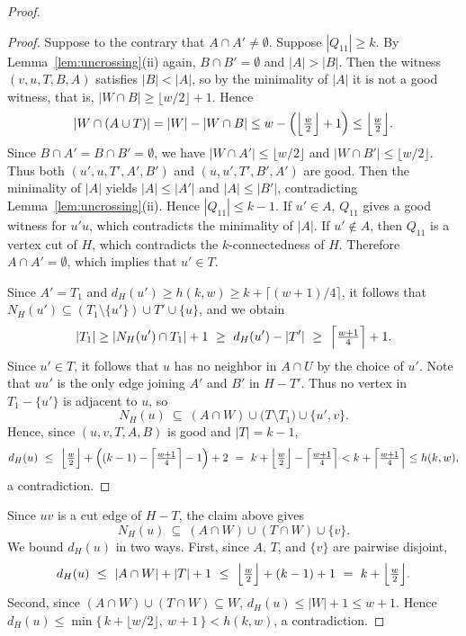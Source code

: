\documentclass[11pt]{article}
\numberwithin{equation}{section}
\begin{document}
\begin{proof}
\begin{proof}
Suppose to the contrary that $A\cap A'\neq \emptyset$. Suppose $|Q_{11}|\ge k$.
By Lemma~\ref{lem:uncrossing}(ii) again, $B\cap B'=\emptyset$ and $|A|>|B|$.
Then the witness $(v,u,T,B,A)$ satisfies $|B|<|A|$, so by the minimality of $|A|$ it is not a good witness, that is, $|W\cap B|\ge\lfloor w/2\rfloor+1$. Hence
\[
   |W\cap(A\cup T)|=|W|-|W\cap B|
   \le w-\Bigl(\Bigl\lfloor\tfrac w2\Bigr\rfloor+1\Bigr)
   \le \Bigl\lfloor\tfrac w2\Bigr\rfloor .
\]
Since $B\cap A'=B\cap B'=\emptyset$, we have $|W\cap A'|\le\lfloor w/2\rfloor$ and $|W\cap B'|\le\lfloor w/2\rfloor$. 
Thus both $(u',u,T',A',B')$ and $(u,u',T',B',A')$ are good.
Then the minimality of $|A|$ yields $|A|\le|A'|$ and $|A|\le|B'|$, contradicting Lemma~\ref{lem:uncrossing}(ii).
Hence $|Q_{11}|\le k-1$.
If $u'\in A$, $Q_{11}$ gives a good witness for $u'u$, which contradicts the minimality of $|A|$. 
If $u' \not\in A$, then $Q_{11}$ is a vertex cut of $H$, which contradicts the $k$-connectedness of $H$.
Therefore $A\cap A'=\emptyset$, which implies that $u' \in T$.

Since $A'=T_1$ and $d_H(u')\ge h(k,w)\ge k+\lceil (w+1)/4\rceil$, 
it follows that $N_H(u')\subseteq (T_1\setminus\{u'\})\cup T'\cup\{u\}$, and we obtain 
\[
   |T_1|\ge |N_H(u')\cap T_1|+1\ \ge\ d_H(u')-|T'|\ \ge\ \Bigl\lceil \tfrac{w+1}{4}\Bigr\rceil+1.
\]
Since $u' \in T$, it follows that $u$ has no neighbor in $A\cap U$ by the choice of $u'$.
Note that $uu'$ is the only edge joining $A'$ and $B'$ in $H-T'$.
Thus no vertex in $T_1-\{u'\}$ is adjacent to $u$, so 
\[
   N_H(u)\ \subseteq\ (A\cap W) \cup \bigl(T\setminus T_1 \bigr) \cup \{u', v\} .
\]
Hence, since $(u,v,T,A,B)$ is good and $|T|=k-1$,
\[
   d_H(u)\ \le\ \Bigl\lfloor\tfrac w2\Bigr\rfloor
              +\Bigl((k-1)-\Bigl\lceil \tfrac{w+1}{4}\Bigr\rceil-1 \Bigr)+2
          \ =\ k+\Bigl\lfloor\tfrac w2\Bigr\rfloor-\Bigl\lceil \tfrac{w+1}{4}\Bigr\rceil < k+\Bigl\lceil \tfrac{w+1}{4}\Bigr\rceil \le h(k,w),
\]
a contradiction. 
\end{proof}


Since $uv$ is a cut edge of $H-T$, the claim above gives
\[   N_H(u)\ \subseteq\ (A\cap W) \cup (T\cap W) \cup \{v\}.\]
We bound $d_H(u)$ in two ways.
First, since $A$, $T$, and $\{v\}$ are pairwise disjoint, 
\[
   d_H(u)\ \le\ |A\cap W|+|T|+1\ \le\ \Bigl\lfloor\tfrac w2\Bigr\rfloor+(k-1)+1
         \ =\ k+\Bigl\lfloor\tfrac w2\Bigr\rfloor .
\]
Second, since $(A\cap W)\cup(T\cap W)\subseteq W$, $d_H(u)  \le  |W|+1  \le  w+1$.
Hence
$d_H(u)\le\min\bigl\{\,k+\lfloor w/2\rfloor,\ w+1\,\bigr\} < h(k,w)$, a contradiction.  
\end{proof}
\end{document}
